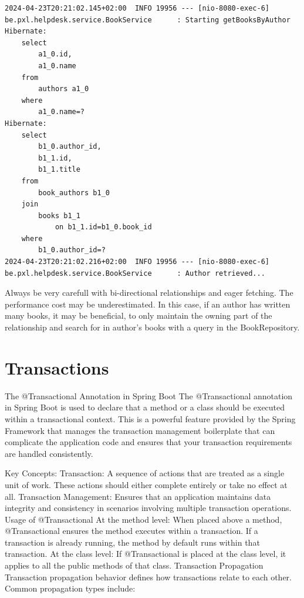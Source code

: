 \begin{verbatim}
2024-04-23T20:21:02.145+02:00  INFO 19956 --- [nio-8080-exec-6] be.pxl.helpdesk.service.BookService      : Starting getBooksByAuthor
Hibernate: 
    select
        a1_0.id,
        a1_0.name 
    from
        authors a1_0 
    where
        a1_0.name=?
Hibernate: 
    select
        b1_0.author_id,
        b1_1.id,
        b1_1.title 
    from
        book_authors b1_0 
    join
        books b1_1 
            on b1_1.id=b1_0.book_id 
    where
        b1_0.author_id=?
2024-04-23T20:21:02.216+02:00  INFO 19956 --- [nio-8080-exec-6] be.pxl.helpdesk.service.BookService      : Author retrieved...
\end{verbatim}

Always be very carefull with bi-directional relationships and eager fetching. The performance cost may be underestimated. In this case, if an author has written many books, it may be beneficial, to only maintain the owning part of the relationship and search for in author's books with a query in the BookRepository.

\section{Transactions}

The @Transactional Annotation in Spring Boot
The @Transactional annotation in Spring Boot is used to declare that a method or a class should be executed within a transactional context. This is a powerful feature provided by the Spring Framework that manages the transaction management boilerplate that can complicate the application code and ensures that your transaction requirements are handled consistently.

Key Concepts:
Transaction: A sequence of actions that are treated as a single unit of work. These actions should either complete entirely or take no effect at all.
Transaction Management: Ensures that an application maintains data integrity and consistency in scenarios involving multiple transaction operations.
Usage of @Transactional
At the method level: When placed above a method, @Transactional ensures the method executes within a transaction. If a transaction is already running, the method by default runs within that transaction.
At the class level: If @Transactional is placed at the class level, it applies to all the public methods of that class.
Transaction Propagation
Transaction propagation behavior defines how transactions relate to each other. Common propagation types include:

